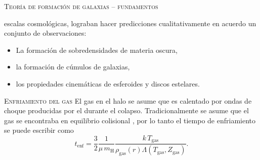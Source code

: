 \documentclass[xcolor=dvipsnames,4pt,hyperref={colorlinks,citecolor=black,linkcolor=black,urlcolor=black}]{beamer}
\begin{document}
\begin{frame}[allowframebreaks]{\textsc{Teoría de formación de galaxias -- fundamentos}}
\begin{description}
escalas cosmológicas, lograban hacer predicciones cualitativamente en acuerdo un conjunto de
observaciones:
%
\begin{itemize}
%
\item La formación de sobredensidades de materia oscura,
\item la formación de cúmulos de galaxias,
\item los propiedades cinemáticas de esferoides y discos estelares.
\end{itemize}
%
\end{description}
\end{frame}

\begin{frame}[allowframebreaks]{\textsc{Enfriamiento del gas}}
%
%
El gas en el halo se asume que es calentado por ondas de choque producidas por el durante el
colapso. Tradicionalmente se asume que el gas se encontraba en equilibrio colisional \citep[sin
embargo véase][]{Wiersma2009a}, por lo tanto el tiempo de enfriamiento se puede escribir como
%
$$
t_\text{enf} = \frac{3}{2}\frac{1}{\mu\,m_\text{H}}\frac{k\,T_\text{gas}}{\rho_\text{gas}(r)\Lambda(T_\text{gas}, Z_\text{gas})}.
$$
\end{frame}
\end{document}
